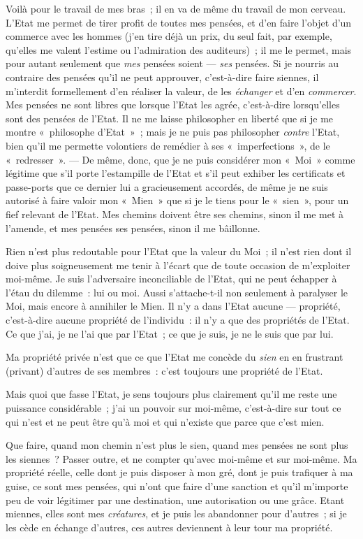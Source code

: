 \documentclass[french,twoside]{book} %
\begin{document}
Voilà pour le travail de mes bras ; il en va de même du travail de mon cerveau. L’Etat me permet de tirer profit de toutes mes pensées, et d’en faire l’objet d’un commerce avec les hommes (j’en tire déjà un prix, du seul fait, par exemple, qu’elles me valent l’estime ou l’admiration des auditeurs) ; il me le permet, mais pour autant seulement que \emph{mes} pensées soient — \emph{ses} pensées. Si je nourris au contraire des pensées qu’il ne peut approuver, c’est-à-dire faire siennes, il m’interdit formellement d’en réaliser la valeur, de les \emph{échanger} et d’en \emph{commercer}. Mes pensées ne sont libres que lorsque l’Etat les agrée, c’est-à-dire lorsqu’elles sont des pensées de l’Etat. Il ne me laisse philosopher en liberté que si je me montre « philosophe d’Etat » ; mais je ne puis pas philosopher \emph{contre }l’Etat, bien qu’il me permette volontiers de remédier à ses « imperfections », de le « redresser ». — De même, donc, que je ne puis considérer mon « Moi » comme légitime que s’il porte l’estampille de l’Etat et s’il peut exhiber les certificats et passe-ports que ce dernier lui a gracieusement accordés, de même je ne suis  autorisé à faire valoir mon « Mien » que si je le tiens pour le « sien », pour un fief relevant de l’Etat. Mes chemins doivent être ses chemins, sinon il me met à l’amende, et mes pensées ses pensées, sinon il me bâillonne.\par
Rien n’est plus redoutable pour l’Etat que la valeur du Moi ; il n’est rien dont il doive plus soigneusement me tenir à l’écart que de toute occasion de m’exploiter moi-même. Je suis l’adversaire inconciliable de l’Etat, qui ne peut échapper à l’étau du dilemme : lui ou moi. Aussi s’attache-t-il non seulement à paralyser le Moi, mais encore à annihiler le Mien. Il n’y a dans l’Etat aucune — propriété, c’est-à-dire aucune propriété de l’individu : il n’y a que des propriétés de l’Etat. Ce que j’ai, je ne l’ai que par l’Etat ; ce que je suis, je ne le suis que par lui.\par
Ma propriété privée n’est que ce que l’Etat me concède du \emph{sien} en en frustrant (privant) d’autres de ses membres : c’est toujours une propriété de l’Etat.\par
Mais quoi que fasse l’Etat, je sens toujours plus clairement qu’il me reste une puissance considérable ; j’ai un pouvoir sur moi-même, c’est-à-dire sur tout ce qui n’est et ne peut être qu’à moi et qui n’existe que parce que c’est mien.\par
Que faire, quand mon chemin n’est plus le sien, quand mes pensées ne sont plus les siennes ? Passer outre, et ne compter qu’avec moi-même et sur moi-même. Ma propriété réelle, celle dont je puis disposer à mon gré, dont je puis trafiquer à ma guise, ce sont mes pensées, qui n’ont que faire d’une sanction et qu’il m’importe peu de voir légitimer par une destination, une autorisation ou une grâce. Etant miennes, elles sont mes \emph{créatures}, et je puis les abandonner pour d’autres ; si je les cède en échange d’autres, ces autres deviennent à leur tour ma propriété.\par
\end{document}
